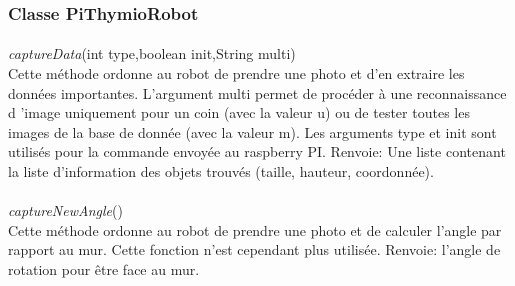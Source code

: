 \documentclass[12pt]{report}
\begin{document}
\subsubsection{Classe PiThymioRobot}

\paragraph{}
\textit{captureData}(int type,boolean init,String multi)\\
Cette méthode ordonne au robot de prendre une photo et d'en extraire les données importantes. L'argument multi permet de procéder à une reconnaissance d 'image uniquement pour un coin (avec la valeur u) ou de tester toutes les images de la base de donnée (avec la valeur m). Les arguments type et init sont utilisés pour la commande envoyée au raspberry PI.
Renvoie: Une liste contenant la liste d'information des objets trouvés (taille, hauteur, coordonnée).

\paragraph{}
\textit{captureNewAngle}()\\
Cette méthode ordonne au robot de prendre une photo et de calculer l'angle par rapport au mur. Cette fonction n'est cependant plus utilisée.
Renvoie: l'angle de rotation pour être face au mur.
\end{document}
